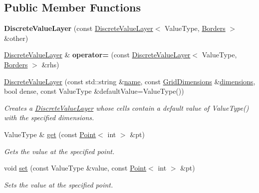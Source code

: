 \subsection*{Public Member Functions}
\begin{DoxyCompactItemize}
\item 
\hypertarget{classrepast_1_1_discrete_value_layer_aae74c061422347ebccf0163db1f0998f}{{\bfseries Discrete\-Value\-Layer} (const \hyperlink{classrepast_1_1_discrete_value_layer}{Discrete\-Value\-Layer}$<$ Value\-Type, \hyperlink{classrepast_1_1_borders}{Borders} $>$ \&other)}\label{classrepast_1_1_discrete_value_layer_aae74c061422347ebccf0163db1f0998f}

\item 
\hypertarget{classrepast_1_1_discrete_value_layer_aaea82e29c4e38e63e7921b1d83895654}{\hyperlink{classrepast_1_1_discrete_value_layer}{Discrete\-Value\-Layer} \& {\bfseries operator=} (const \hyperlink{classrepast_1_1_discrete_value_layer}{Discrete\-Value\-Layer}$<$ Value\-Type, \hyperlink{classrepast_1_1_borders}{Borders} $>$ \&rhs)}\label{classrepast_1_1_discrete_value_layer_aaea82e29c4e38e63e7921b1d83895654}

\item 
\hyperlink{classrepast_1_1_discrete_value_layer_a146b16f54f9b13ccfeb6462f359d0203}{Discrete\-Value\-Layer} (const std\-::string \&\hyperlink{classrepast_1_1_base_value_layer_a27277765ee50f9d5446b253f77797f5c}{name}, const \hyperlink{classrepast_1_1_grid_dimensions}{Grid\-Dimensions} \&\hyperlink{classrepast_1_1_value_layer_a51fe7fe718305d0c006bc465a14ef0e3}{dimensions}, bool dense, const Value\-Type \&default\-Value=Value\-Type())
\begin{DoxyCompactList}\small\item\em Creates a \hyperlink{classrepast_1_1_discrete_value_layer}{Discrete\-Value\-Layer} whose cells contain a default value of Value\-Type() with the specified dimensions. \end{DoxyCompactList}\item 
Value\-Type \& \hyperlink{classrepast_1_1_discrete_value_layer_abf7996a02382f6a28b3d993a156386c7}{get} (const \hyperlink{classrepast_1_1_point}{Point}$<$ int $>$ \&pt)
\begin{DoxyCompactList}\small\item\em Gets the value at the specified point. \end{DoxyCompactList}\item 
void \hyperlink{classrepast_1_1_discrete_value_layer_a2070dcc808c4d5b48de96b278f8a8d89}{set} (const Value\-Type \&value, const \hyperlink{classrepast_1_1_point}{Point}$<$ int $>$ \&pt)
\begin{DoxyCompactList}\small\item\em Sets the value at the specified point. \end{DoxyCompactList}\end{DoxyCompactItemize}
